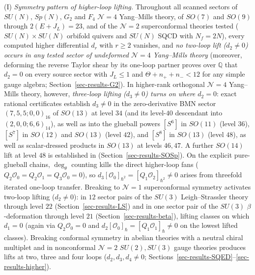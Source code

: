 \documentclass[11pt]{article}
\numberwithin{equation}{section}
\numberwithin{figure}{section}
\numberwithin{table}{section}
\begin{document}
(I) \emph{Symmetry pattern of higher-loop lifting.} Throughout all scanned sectors of $SU(N)$, $Sp(N)$, $G_2$ and $F_4$ $\mathcal N=4$ Yang--Mills theory, of $SO(7)$ and $SO(9)$ through $2(E+J_L)=23$, and of the $\mathcal N=2$ superconformal theories tested ($SU(N)\times SU(N)$ orbifold quivers and $SU(N)$ SQCD with $N_f=2N$), every computed higher differential $d_r$ with $r\ge2$ vanishes, and \emph{no two-loop lift ($d_2\ne0$) occurs in any tested sector of undeformed $\mathcal N=4$ Yang--Mills theory} (moreover, deforming the reverse Taylor shear by its one-loop partner proves over $\mathbb Q$ that $d_2=0$ on every source sector with $J_L\le1$ and $\Theta+n_++n_-<12$ for any simple gauge algebra; Section~\ref{sec-results-G2}). In higher-rank orthogonal $\mathcal N=4$ Yang--Mills theory, however, \emph{three-loop lifting ($d_3\ne0$) turns on where $d_2=0$}: exact rational certificates establish $d_3\ne0$ in the zero-derivative BMN sector $(7,5,5;0,0)_{16}$ of $SO(13)$ at level $34$ (and its level-$40$ descendant into $(2,0,0;6,6)_{14}$), as well as into the glueball powers $[S^6]$ in $SO(11)$ (level $36$), $[S^7]$ in $SO(12)$ and $SO(13)$ (level $42$), and $[S^8]$ in $SO(13)$ (level $48$), as well as scalar-dressed products in $SO(13)$ at levels $46,47$. A further $SO(14)$ lift at level $48$ is established in \cite{Repo} (Section~\ref{sec-results-SOSp}). On the explicit pure-glueball chains, $\deg_\theta$ counting kills the direct higher-loop fans ($Q_2\mathcal O_0=Q_2\mathcal O_1=Q_3\mathcal O_0=0$), so $d_3[\mathcal O_0]_{\hbar^2}=[Q_1\mathcal O_2]_{\hbar^2}\ne0$ arises from threefold iterated one-loop transfer. Breaking to $\mathcal N=1$ superconformal symmetry activates two-loop lifting ($d_2\ne0$): in $12$ sector pairs of the $SU(3)$ Leigh--Strassler theory through level $22$ (Section~\ref{sec-results-LS}) and in one sector pair of the $SU(3)$ $\beta$-deformation through level $21$ (Section~\ref{sec-results-beta}), lifting classes on which $d_1=0$ (again via $Q_2\mathcal O_0=0$ and $d_2[\mathcal O_0]_{\hbar}=[Q_1\mathcal O_1]_{\hbar}\ne0$ on the lowest lifted classes). Breaking conformal symmetry in abelian theories with a neutral chiral multiplet and in nonconformal $\mathcal N=2$ $SU(2),SU(3)$ gauge theories produces lifts at two, three and four loops ($d_2,d_3,d_4\ne0$; Sections~\ref{sec-results-SQED}--\ref{sec-results-higher}).
\end{document}
